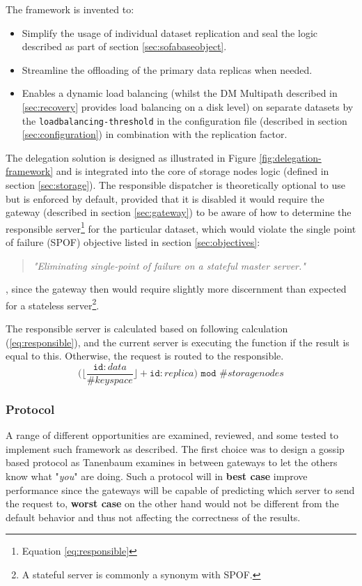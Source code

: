 \noindent
The framework is invented to:
\begin{itemize}
	\item Simplify the usage of individual dataset replication and seal the logic described as part of section \ref{sec:sofabaseobject}.
	\item Streamline the offloading of the primary data replicas when needed.
	\item Enables a dynamic load balancing (whilst the DM Multipath described in \ref{sec:recovery} provides load balancing on a disk level) on separate datasets by the \texttt{load\-balancing-threshold} in the configuration file (described in section \ref{sec:configuration}) in combination with the replication factor.
\end{itemize}
\vspace*{4mm}
The delegation solution is designed as illustrated in Figure \ref{fig:delegation-framework} and is integrated into the core of storage nodes logic (defined in section \ref{sec:storage}). The responsible dispatcher is theoretically optional to use but is enforced by default, provided that it is disabled it would require the gateway (described in section \ref{sec:gateway}) to be aware of how to determine the responsible server\footnote{Equation \ref{eq:responsible}} for the particular dataset, which would violate the single point of failure (SPOF) objective listed in section \ref{sec:objectives}:
\begin{quotation}
\textit{"Eliminating single-point of failure on a stateful master server."}
\end{quotation}
, since the gateway then would require slightly more discernment than expected for a stateless server\footnote{\label{note:stateful}A stateful server is commonly a synonym with SPOF.}.
\clearpage

The responsible server is calculated based on following calculation (\ref{eq:responsible}), and the current server is executing the function if the result is equal to this. Otherwise, the request is routed to the responsible.
\begin{equation} \label{eq:responsible}
\Big(\Big\lfloor\dfrac{\texttt{id}:data}{\texttt{\#}keyspace}\Big\rfloor + \texttt{id}:replica\Big) \texttt{ mod } \texttt{\#}storagenodes
\end{equation}

\subsubsection*{Protocol}
A range of different opportunities are examined, reviewed, and some tested to implement such framework as described. The first choice was to design a gossip based protocol as Tanenbaum \etal examines in \cite{Tanenbaum:2006:DSP:1202502} between gateways to let the others know what "\textit{you}" are doing. Such a protocol will in \textbf{best case} improve performance since the gateways will be capable of predicting which server to send the request to, \textbf{worst case} on the other hand would not be different from the default behavior and thus not affecting the correctness of the results.
\newline

